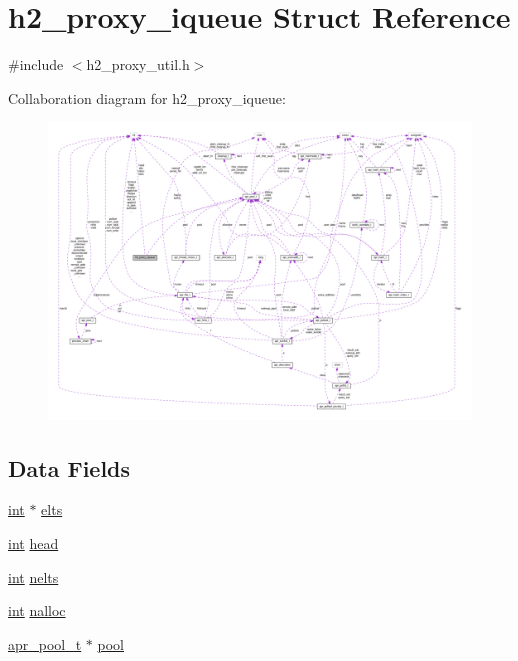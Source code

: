\hypertarget{structh2__proxy__iqueue}{}\section{h2\+\_\+proxy\+\_\+iqueue Struct Reference}
\label{structh2__proxy__iqueue}


{\ttfamily \#include $<$h2\+\_\+proxy\+\_\+util.\+h$>$}



Collaboration diagram for h2\+\_\+proxy\+\_\+iqueue\+:
\nopagebreak
\begin{figure}[H]
\begin{center}
\leavevmode
\includegraphics[width=350pt]{structh2__proxy__iqueue__coll__graph}
\end{center}
\end{figure}
\subsection*{Data Fields}
\begin{DoxyCompactItemize}
\item 
\hyperlink{pcre_8txt_a42dfa4ff673c82d8efe7144098fbc198}{int} $\ast$ \hyperlink{structh2__proxy__iqueue_a1ab76e5458013562705781fc199e0a2a}{elts}
\item 
\hyperlink{pcre_8txt_a42dfa4ff673c82d8efe7144098fbc198}{int} \hyperlink{structh2__proxy__iqueue_a2b5aadd60bfde4edad8634d813facaa4}{head}
\item 
\hyperlink{pcre_8txt_a42dfa4ff673c82d8efe7144098fbc198}{int} \hyperlink{structh2__proxy__iqueue_a9458266f1b480b4092267b6f82138589}{nelts}
\item 
\hyperlink{pcre_8txt_a42dfa4ff673c82d8efe7144098fbc198}{int} \hyperlink{structh2__proxy__iqueue_a89b1c597dab4c00a93c8f506c7034930}{nalloc}
\item 
\hyperlink{structapr__pool__t}{apr\+\_\+pool\+\_\+t} $\ast$ \hyperlink{structh2__proxy__iqueue_a3bb620009fcc283b68f5f73d9a197c79}{pool}
\end{DoxyCompactItemize}


